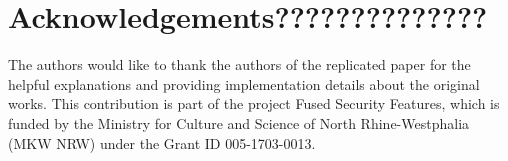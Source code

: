 \section{Acknowledgements??????????????}

The authors would like to thank the authors of the replicated paper for the helpful explanations and providing implementation details about the original works. This contribution is part of the project Fused Security Features, which is funded by the Ministry for Culture and Science of North Rhine-Westphalia (MKW NRW) under the Grant ID 005-1703-0013.